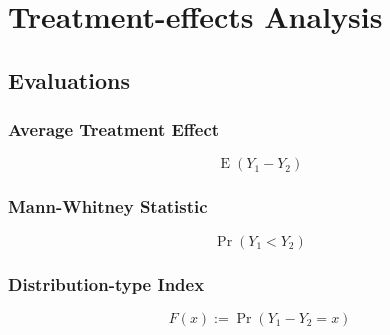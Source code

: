 \chapter{Treatment-effects Analysis}

\section{Evaluations}

\subsection{Average Treatment Effect}

\begin{definition}
    \begin{equation}
        \operatorname{E}\left(Y_{1}-Y_{2}\right)
    \end{equation}
\end{definition}

\subsection{Mann-Whitney Statistic}

\begin{definition}
    \begin{equation}
        \operatorname{Pr}\left(Y_{1}<Y_{2}\right)
    \end{equation}
\end{definition}

\subsection{Distribution-type Index}

\begin{definition}
    \begin{equation}
        F(x):=\operatorname{Pr}\left(Y_{1}-Y_{2}=x\right)
    \end{equation}
\end{definition}

